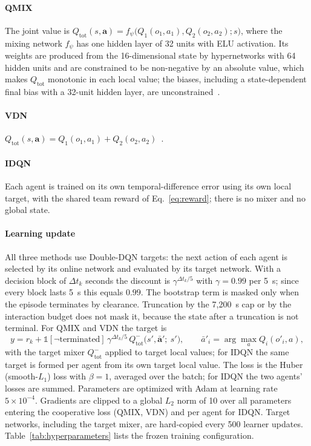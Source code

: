 \documentclass[review,12pt]{elsarticle}
\begin{document}
\paragraph{QMIX} The joint value is
$Q_{\mathrm{tot}}(s,\mathbf a)=f_{\psi}\bigl(Q_1(o_1,a_1),Q_2(o_2,a_2);s\bigr)$,
where the mixing network $f_\psi$ has one hidden layer of 32 units with
ELU activation. Its weights are produced from the 16-dimensional state
by hypernetworks with 64 hidden units and are constrained to be
non-negative by an absolute value, which makes $Q_{\mathrm{tot}}$
monotonic in each local value; the biases, including a state-dependent
final bias with a 32-unit hidden layer, are unconstrained~\cite{Rashid2018}.

\paragraph{VDN} $Q_{\mathrm{tot}}(s,\mathbf a)=Q_1(o_1,a_1)+Q_2(o_2,a_2)$~\cite{sunehag2017value}.

\paragraph{IDQN} Each agent is trained on its own temporal-difference
error using its own local target, with the shared team reward of
Eq.~\eqref{eq:reward}; there is no mixer and no global state.

\paragraph{Learning update} All three methods use Double-DQN targets:
the next action of each agent is selected by its online network and
evaluated by its target network.
With a decision block of $\Delta t_k$ seconds the discount is
$\gamma^{\Delta t_k/5}$ with $\gamma=0.99$ per 5~s; since every block
lasts 5~s this equals $0.99$. The bootstrap term is masked only when the
episode terminates by clearance. Truncation by the 7{,}200~s cap or by
the interaction budget does not mask it, because the state after a
truncation is not terminal. For QMIX and VDN the target is
\begin{equation}
y=r_k+\mathbb{1}[\neg\text{terminated}]\,\gamma^{\Delta t_k/5}\,
Q^{-}_{\mathrm{tot}}\bigl(s',\bar{\mathbf a}';\ s'\bigr),\qquad
\bar a'_i=\arg\max_{a}Q_i(o'_i,a),
\label{eq:target}
\end{equation}
with the target mixer $Q^{-}_{\mathrm{tot}}$ applied to target local
values; for IDQN the same target is formed per agent from its own target
local value. The loss is the Huber (smooth-$L_1$) loss with
$\beta=1$, averaged over the batch; for IDQN the two agents' losses are
summed.
Parameters are optimized with Adam at learning rate $5\times10^{-4}$.
Gradients are clipped to a global $L_2$ norm of 10 over all parameters
entering the cooperative loss (QMIX, VDN) and per agent for IDQN.
Target networks, including the target mixer, are hard-copied every 500
learner updates. Table~\ref{tab:hyperparameters} lists the frozen
training configuration.
\end{document}
